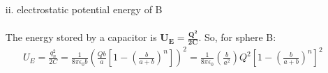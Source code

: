 \documentclass[]{article}
\begin{document}
{\begin{enumerate}[label=\roman*,topsep=0pt]
\begin{equation*}
\begin{split}
							\end{split}
						\end{equation*}
					Clearly, a geometric series for $\bm{q_n}$ start to form with common ratio $\bm{r} = \frac{b}{a + b}$
						\begin{equation*}
							\begin{split}
								q_n &= Q \left[ \frac{b}{a + b} + \left( \frac{b}{a + b} \right)^2 + \dots + \left( \frac{b}{a + b} \right)^n \right] \\
								&= Q \left[ \frac{b}{a + b} \left( \frac{1 - \left( \frac{b}{a + b} \right)^n }{1 - \frac{b}{a + b} } \right) \right] =
								\frac{Qb}{a} \left[ 1 - \left( \frac{b}{a + b} \right)^n \right]  \\
							\end{split}
						\end{equation*}
		\clearpage
				\item[ii.] electrostatic potential energy of B \\
				\\
					The energy stored by a capacitor is $ \bm{U_E = \frac{Q^2}{2C}} $. So, for sphere B:
						\begin{equation*}
							\begin{split}
								U_E = \frac{q_n^2}{2C}
								= \frac{1}{8\pi \epsilon_0 b} \left( \frac{Qb}{a} \left[ 1 - \left( \frac{b}{a + b} \right)^n \right] \right)^2
								= \frac{1}{8\pi \epsilon_0} \left( \frac{b}{a^2} \right) Q^2 \left[ 1 - \left( \frac{b}{a + b} \right)^n \right]^2
							\end{split}
						\end{equation*}
				
			\end{enumerate}
		
}
\end{document}
